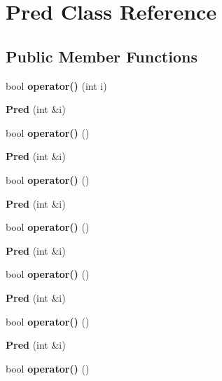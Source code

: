 \hypertarget{struct_pred}{}\section{Pred Class Reference}
\label{struct_pred}
\subsection*{Public Member Functions}
\begin{DoxyCompactItemize}
\item 
\mbox{\label{struct_pred_ab995ae71e100d2fe139316eb4590bac4}} 
bool {\bfseries operator()} (int i)
\item 
\mbox{\label{struct_pred_a38756b92e01fcc7f6ace40db06a1c0d4}} 
{\bfseries Pred} (int \&i)
\item 
\mbox{\label{struct_pred_abde22783044e11d988c7d732e6e65c17}} 
bool {\bfseries operator()} ()
\item 
\mbox{\label{struct_pred_a38756b92e01fcc7f6ace40db06a1c0d4}} 
{\bfseries Pred} (int \&i)
\item 
\mbox{\label{struct_pred_abde22783044e11d988c7d732e6e65c17}} 
bool {\bfseries operator()} ()
\item 
\mbox{\label{struct_pred_a38756b92e01fcc7f6ace40db06a1c0d4}} 
{\bfseries Pred} (int \&i)
\item 
\mbox{\label{struct_pred_abde22783044e11d988c7d732e6e65c17}} 
bool {\bfseries operator()} ()
\item 
\mbox{\label{struct_pred_a38756b92e01fcc7f6ace40db06a1c0d4}} 
{\bfseries Pred} (int \&i)
\item 
\mbox{\label{struct_pred_abde22783044e11d988c7d732e6e65c17}} 
bool {\bfseries operator()} ()
\item 
\mbox{\label{struct_pred_a38756b92e01fcc7f6ace40db06a1c0d4}} 
{\bfseries Pred} (int \&i)
\item 
\mbox{\label{struct_pred_abde22783044e11d988c7d732e6e65c17}} 
bool {\bfseries operator()} ()
\item 
\mbox{\label{struct_pred_a38756b92e01fcc7f6ace40db06a1c0d4}} 
{\bfseries Pred} (int \&i)
\item 
\mbox{\label{struct_pred_abde22783044e11d988c7d732e6e65c17}} 
bool {\bfseries operator()} ()
\end{DoxyCompactItemize}


